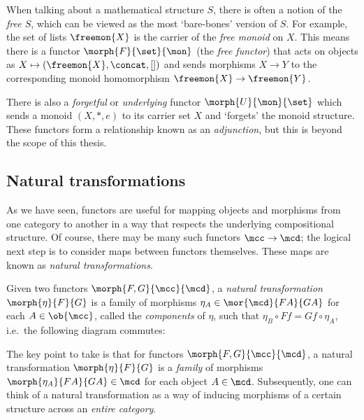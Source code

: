 \begin{example}\label{ex:free-monoid}
    When talking about a mathematical structure \(S\), there is often a notion
    of the \emph{free \(S\)}, which can be viewed as the most `bare-bones'
    version of \(S\).
    For example, the set of lists \(\freemon{X}\) is the carrier of the
    \emph{free monoid} on \(X\).
    This means there is a functor \(\morph{F}{\set}{\mon}\) (the
    \emph{free functor}) that acts on objects as \(
        X \mapsto (\freemon{X}, \concat, [])
    \) and sends morphisms \(X \to Y\) to the corresponding monoid homomorphism
    \(\freemon{X} \to \freemon{Y}\).

    There is also a \emph{forgetful} or \emph{underlying} functor
    \(\morph{U}{\mon}{\set}\) which sends a monoid \((X, *, e)\) to its carrier
    set \(X\) and `forgets' the monoid structure.
    These functors form a relationship known as an \emph{adjunction}, but this
    is beyond the scope of this thesis.
\end{example}

\subsection{Natural transformations}

As we have seen, functors are useful for mapping objects and morphisms from one
category to another in a way that respects the underlying compositional
structure.
Of course, there may be many such functors \(\mcc \to \mcd\); the logical next
step is to consider maps between functors themselves.
These maps are known as \emph{natural transformations}.

\begin{definition}
    Given two functors \(\morph{F, G}{\mcc}{\mcd}\), a
    \emph{natural transformation} \(\morph{\eta}{F}{G}\) is a family of
    morphisms \(
        \eta_A \in \mor{\mcd}{FA}{GA}
    \) for each \(A \in \ob{\mcc}\), called the \emph{components} of \(\eta\),
    such that \(
        \eta_B \circ Ff = Gf \circ \eta_A
    \), i.e.\ the following diagram commutes:
    \begin{center}
        
    \end{center}
\end{definition}

The key point to take is that for functors \(\morph{F,G}{\mcc}{\mcd}\), a
natural transformation \(\morph{\eta}{F}{G}\) is a \emph{family} of morphisms
\(\morph{\eta_A}{FA}{GA} \in \mcd\) for each object \(A \in \mcd\).
Subsequently, one can think of a natural transformation as a way of inducing
morphisms of a certain structure across an \emph{entire category}.

